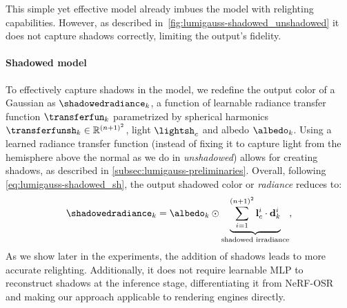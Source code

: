      This simple yet effective model already imbues the model with relighting
      capabilities.
      However, as described in~\cref{fig:lumigauss-shadowed_unshadowed} it does not
      capture shadows correctly, limiting the output's fidelity.

      
    \paragraph{Shadowed model}
      To effectively capture shadows in the model, we redefine the output color of a
      Gaussian as $\shadowedradiance_k$, a function of learnable radiance transfer
      function $\transferfun_k$ parametrized by spherical harmonics
      $\transferfunsh_k \in \mathbb{R}^{(n+1)^2}$, light $\lightsh_c$ and albedo
      $\albedo_k$.
      Using a learned radiance transfer function (instead of fixing it to capture
      light from the hemisphere above the normal as we do in \textit{unshadowed})
      allows for creating shadows, as described in
      \cref{subsec:lumigauss-preliminaries}.
      Overall, following \cref{eq:lumigauss-shadowed_sh}, the output shadowed color or \textit{radiance} reduces to:
      \begin{equation}
        \label{eq:lumigauss-shadowed-radiance}
        \shadowedradiance_{k}   = \albedo_k \odot \underbrace{\sum_{i=1}^{(n+1)^2}{\mathbf{l}_c^i \cdot \mathbf{d}_{k}^i}}_{\text{shadowed irradiance}},
      \end{equation}
      As we show later in the experiments, the addition of shadows leads to more
      accurate relighting.
      Additionally, it does not require learnable MLP to reconstruct shadows at the
      inference stage, differentiating it from NeRF-OSR~\cite{rudnev2022nerfosr} and
      making our approach applicable to rendering engines directly.


      

